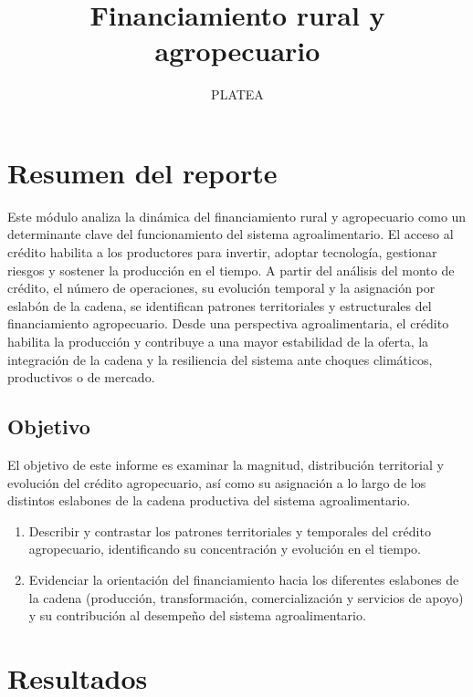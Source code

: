 \documentclass[
]{article}
\title{Financiamiento rural y agropecuario}
\subtitle{PLATEA}
\author{}
\date{\vspace{-2.5em}}
\begin{document}
\maketitle

{
\setcounter{tocdepth}{2}
\tableofcontents
}
\section{Resumen del reporte}\label{resumen-del-reporte}

Este módulo analiza la dinámica del financiamiento rural y agropecuario
como un determinante clave del funcionamiento del sistema
agroalimentario. El acceso al crédito habilita a los productores para
invertir, adoptar tecnología, gestionar riesgos y sostener la producción
en el tiempo. A partir del análisis del monto de crédito, el número de
operaciones, su evolución temporal y la asignación por eslabón de la
cadena, se identifican patrones territoriales y estructurales del
financiamiento agropecuario. Desde una perspectiva agroalimentaria, el
crédito habilita la producción y contribuye a una mayor estabilidad de
la oferta, la integración de la cadena y la resiliencia del sistema ante
choques climáticos, productivos o de mercado.

\subsection{Objetivo}\label{objetivo}

El objetivo de este informe es examinar la magnitud, distribución
territorial y evolución del crédito agropecuario, así como su asignación
a lo largo de los distintos eslabones de la cadena productiva del
sistema agroalimentario.

\begin{enumerate}
\def\labelenumi{\arabic{enumi}.}
\item
  Describir y contrastar los patrones territoriales y temporales del
  crédito agropecuario, identificando su concentración y evolución en el
  tiempo.
\item
  Evidenciar la orientación del financiamiento hacia los diferentes
  eslabones de la cadena (producción, transformación, comercialización y
  servicios de apoyo) y su contribución al desempeño del sistema
  agroalimentario.
\end{enumerate}

\section{Resultados}\label{resultados}
\end{document}
